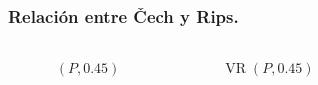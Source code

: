 \documentclass{beamer}
\DeclareMathOperator{\VR}{VR}
\DeclareMathOperator{\Cech}{\check{C}}
\begin{document}
\begin{frame}\frametitle{Relación entre \v{C}ech y Rips.}
  \begin{overprint}
  \begin{columns}
    \begin{figure}[H]
      \centering{}
      \caption{\(\Cech(P, 0.45)\)}
    \end{figure}

    \begin{figure}[H]
      \centering{}
      \caption{\(\VR(P, 0.45)\)}
    \end{figure}
  \end{columns}


\end{overprint}
\end{frame}
\end{document}
